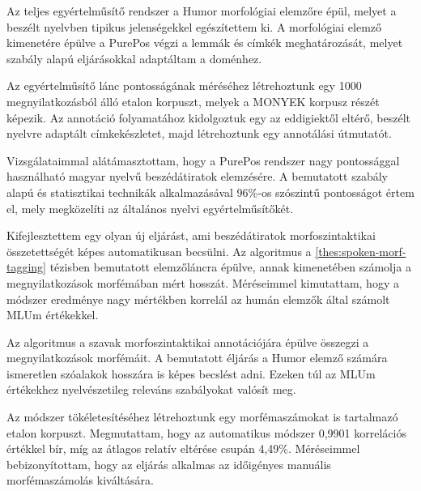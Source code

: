 Az teljes egyértelműsítő rendszer a Humor morfológiai elemzőre épül, melyet a beszélt nyelvben tipikus jelenségekkel egészítettem ki. 
A morfológiai elemző kimenetére épülve a PurePos végzi a lemmák és címkék meghatározását, melyet szabály alapú eljárásokkal adaptáltam a doménhez.

Az egyértelműsítő lánc pontosságának méréséhez létrehoztunk egy 1000 megnyilatkozásból álló etalon korpuszt, melyek a MONYEK \cite{Matyus2014} korpusz részét képezik. 
Az annotáció folyamatához kidolgoztuk egy az eddigiektől eltérő, beszélt nyelvre adaptált címkekészletet, majd létrehoztunk egy annotálási útmutatót.

Vizsgálataimmal alátámasztottam, hogy a PurePos rendszer nagy pontossággal használható magyar nyelvű beszédátiratok elemzésére. 
A bemutatott szabály alapú és statisztikai technikák alkalmazásával 96\%-os szószintű pontosságot értem el, mely megközelíti az általános nyelvi egyértelműsítőkét.


\thesisline%


\begin{core}
\begin{thesis}
\label{thes:mlu-estimation}
Kifejlesztettem egy olyan új eljárást, ami beszédátiratok morfoszintaktikai összetettségét képes automatikusan becsülni.
Az algoritmus a \ref{thes:spoken-morf-tagging} tézisben bemutatott elemzőláncra épülve, annak kimenetében számolja a megnyilatkozások morfémában mért hosszát. 
Méréseimmel kimutattam, hogy a módszer eredménye nagy mértékben korrelál az humán elemzők által számolt MLUm értékekkel.
\end{thesis}

\begin{pub}
\cite{Matyus2014,Orosz2014c}
\end{pub}
\end{core}

Az algoritmus a szavak morfoszintaktikai annotációjára épülve összegzi a megnyilatkozások morfémáit.
A bemutatott éljárás a Humor elemző számára ismeretlen szóalakok hosszára is képes becslést adni.
Ezeken túl az MLUm értékekhez nyelvészetileg releváns szabályokat valósít meg.

Az módszer tökéletesítéséhez létrehoztunk egy morfémaszámokat is tartalmazó etalon korpuszt. 
Megmutattam, hogy az automatikus módszer 0,9901 korrelációs értékkel bír, míg az átlagos relatív eltérése csupán 4,49\%. 
Méréseimmel bebizonyítottam, hogy az eljárás alkalmas az időigényes manuális morfémaszámolás kiváltására.

